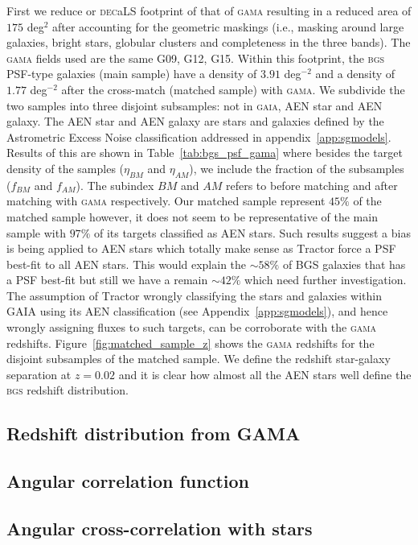 \documentclass[fleqn,usenatbib]{mnras}
\newcommand{\BGS}{\textsc{bgs}\xspace}
\newcommand{\DECaLS}{\textsc{dec}a\textsc{LS}\xspace}
\newcommand{\GAMA}{\textsc{gama}\xspace}
\newcommand{\GAIA}{\textsc{gaia}\xspace}
\newcommand{\TRACTOR}{\textsc{T}ractor\xspace}
\begin{document}
First we reduce or \DECaLS footprint of that of \GAMA resulting in a reduced area of $175$ deg$^2$ after accounting for the geometric maskings (i.e., masking around large galaxies, bright stars, globular clusters and completeness in the three bands). The \GAMA fields used are the same G09, G12, G15. Within this footprint, the \BGS PSF-type galaxies (main sample) have a density of $3.91$ deg$^{-2}$ and a density of $1.77$ deg$^{-2}$ after the cross-match (matched sample) with \GAMA. We subdivide the two samples into three disjoint subsamples: not in \GAIA, AEN star and AEN galaxy. The AEN star and AEN galaxy are stars and galaxies defined by the Astrometric Excess Noise classification addressed in appendix~\ref{app:sgmodels}. Results of this are shown in Table~\ref{tab:bgs_psf_gama} where besides the target density of the samples ($\eta_{BM}$ and $\eta_{AM}$), we include the fraction of the subsamples ($f_{BM}$ and $f_{AM}$). The subindex $BM$ and $AM$ refers to before matching and after matching with \GAMA respectively. Our matched sample represent $45 \%$ of the matched sample however, it does not seem to be representative of the main sample with $97 \%$ of its targets classified as AEN stars. Such results suggest a bias is being applied to AEN stars which totally make sense as \TRACTOR force a PSF best-fit to all AEN stars. This would explain the $\sim 58 \%$ of BGS galaxies that has a PSF best-fit but still we have a remain $\sim 42 \%$ which need further investigation. The assumption of \TRACTOR wrongly classifying the stars and galaxies within GAIA using its AEN classification (see Appendix~\ref{app:sgmodels}), and hence wrongly assigning fluxes to such targets, can be corroborate with the \GAMA redshifts. Figure~\ref{fig:matched_sample_z} shows the \GAMA redshifts for the disjoint subsamples of the matched sample. We define the redshift star-galaxy separation at $z=0.02$ \citep{add cite...} and it is clear how almost all the AEN stars well define the \BGS redshift distribution. 



\subsection{Redshift distribution from GAMA}
\subsection{Angular correlation function}
\subsection{Angular cross-correlation with stars}
\end{document}
